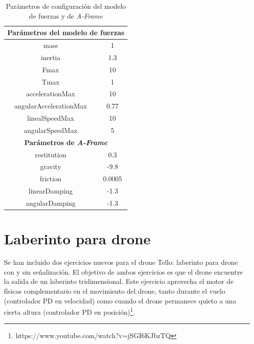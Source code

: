 \begin{table}[h!]
\centering
\begin{tabular}{|c|c|}
\hline
\multicolumn{2}{|c|}{\textbf{Parámetros del modelo de fuerzas}}                \\ \hline
mass                                           & 1                             \\ \hline
inertia                                        & 1.3                           \\ \hline
Fmax                                           & 10                            \\ \hline
Tmax                                           & 1                             \\ \hline
accelerationMax                                & 10                            \\ \hline
angularAccelerationMax                         & 0.77                          \\ \hline
linealSpeedMax                                 & 10                            \\ \hline
angularSpeedMax                                & 5                             \\ \hline
\multicolumn{2}{|c|}{\textbf{Parámetros de \textit{A-Frame}}} \\ \hline
restitution                                    & 0.3                           \\ \hline
gravity                                        & -9.8                          \\ \hline
friction                                       &  0.0005                       \\ \hline
linearDamping                                  & -1.3                          \\ \hline
angularDamping                                 & -1.3                          \\ \hline
\end{tabular}
\caption{Parámetros de configuración del modelo de fuerzas y de \textit{A-Frame}}
\label{tabla:param_ej2}
\end{table}

\newpage
\section{Laberinto para drone}
Se han incluido dos ejercicios nuevos para el drone Tello: laberinto para drone con y sin señalización. El objetivo de ambos ejercicios es que el drone encuentre la salida de un laberinto tridimensional. Este ejercicio aprovecha el motor de físicas complementario en el movimiento del drone, tanto durante el vuelo (controlador PD en velocidad) como cuando el drone permanece quieto a una cierta altura (controlador PD en posición)\footnote{https://www.youtube.com/watch?v=jSGI6KJbzTQ}. \newline

